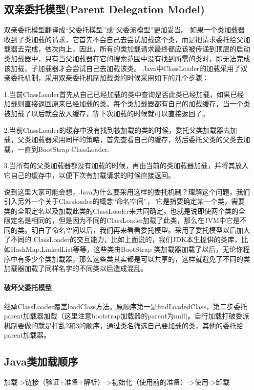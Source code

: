 
\subsection{双亲委托模型(Parent Delegation Model)}

双亲委托模型翻译成“父委托模型”或“父委派模型”更加妥当。
如果一个类加载器收到了类加载的请求，它首先不会自己去尝试加载这个类，而是把请求委托给父加载器去完成，依次向上，因此，所有的类加载请求最终都应该被传递到顶层的启动类加载器中，只有当父加载器在它的搜索范围中没有找到所需的类时，即无法完成该加载，子加载器才会尝试自己去加载该类。
Java中ClassLoader的加载采用了双亲委托机制，采用双亲委托机制加载类的时候采用如下的几个步骤：

1.当前ClassLoader首先从自己已经加载的类中查询是否此类已经加载，如果已经加载则直接返回原来已经加载的类。每个类加载器都有自己的加载缓存，当一个类被加载了以后就会放入缓存，等下次加载的时候就可以直接返回了。

2.当前ClassLoader的缓存中没有找到被加载的类的时候，委托父类加载器去加载，父类加载器采用同样的策略，首先查看自己的缓存，然后委托父类的父类去加载，一直到BootStrap ClassLoader.

3.当所有的父类加载器都没有加载的时候，再由当前的类加载器加载，并将其放入它自己的缓存中，以便下次有加载请求的时候直接返回。

说到这里大家可能会想，Java为什么要采用这样的委托机制？理解这个问题，我们引入另外一个关于Classloader的概念“命名空间”， 它是指要确定某一个类，需要类的全限定名以及加载此类的ClassLoader来共同确定。也就是说即使两个类的全限定名是相同的，但是因为不同的ClassLoader加载了此类，那么在JVM中它是不同的类。明白了命名空间以后，我们再来看看委托模型。采用了委托模型以后加大了不同的 ClassLoader的交互能力，比如上面说的，我们JDK本生提供的类库，比如HashMap,LinkedList等等，这些类由BootStrap 类加载器加载了以后，无论你程序中有多少个类加载器，那么这些类其实都是可以共享的，这样就避免了不同的类加载器加载了同样名字的不同类以后造成混乱。


\paragraph{破坏父委托模型}

继承ClassLoader覆盖loadClass方法。原顺序第一是findLoadedClass，第二步委托parent加载器加载（这里注意bootstrap加载器的parent为null)。自行加载打破委派机制要做的就是打乱2和3的顺序，通过类名筛选自己要加载的类，其他的委托给parent加载器。

\subsection{Java类加载顺序}

加载->链接（验证+准备+解析）->初始化（使用前的准备）->使用->卸载

